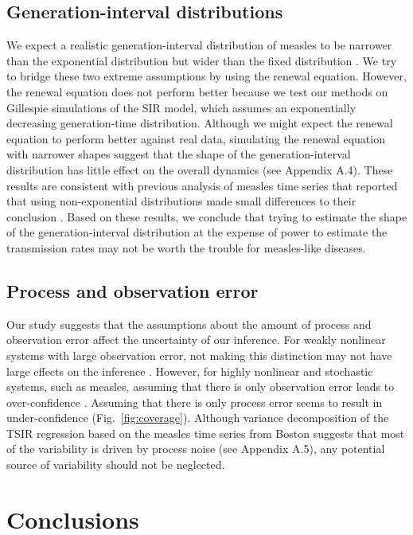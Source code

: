 \documentclass{article}
\newcommand{\fref}[1]{Fig.~\ref{fig:#1}}
\begin{document}
\subsection{Generation-interval distributions}

We expect a realistic generation-interval distribution of measles to be narrower than the exponential distribution but wider than the fixed distribution \citep{simpson1952infectiousness, fraser2007estimating, cori2013new, park2019practical}.
We try to bridge these two extreme assumptions by using the renewal equation.
However, the renewal equation does not perform better because we test our methods on Gillespie simulations of the SIR model, which assumes an exponentially decreasing generation-time distribution.
Although we might expect the renewal equation to perform better against real data, simulating the renewal equation with narrower shapes suggest that the shape of the generation-interval distribution has little effect on the overall dynamics (see Appendix A.4).
These results are consistent with previous analysis of measles time series that reported that using non-exponential distributions made small differences to their conclusion \citep{he2009plug}.
Based on these results, we conclude that trying to estimate the shape of the generation-interval distribution at the expense of power to estimate the transmission rates may not be worth the trouble for measles-like diseases.

\subsection{Process and observation error}

Our study suggests that the assumptions about the amount of process and observation error affect the uncertainty of our inference.
For weakly nonlinear systems with large observation error, not making this distinction may not have large effects on the inference \citep{ma2014estimating}.
However, for highly nonlinear and stochastic systems, such as measles, assuming that there is only observation error leads to over-confidence \citep{king2015avoidable, taylor2016stochasticity}.
Assuming that there is only process error seems to result in under-confidence (\fref{coverage}).
Although variance decomposition of the TSIR regression based on the measles time series from Boston suggests that most of the variability is driven by process noise (see Appendix A.5), 
any potential source of variability should not be neglected.

\section{Conclusions}
\end{document}
